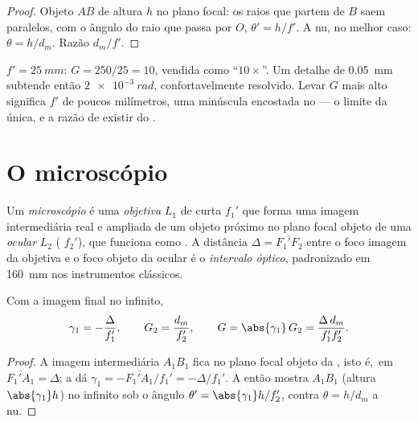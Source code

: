 \begin{proof}
Objeto $AB$ de altura $h$ no plano focal: os raios que partem de $B$ saem
paralelos, com o ângulo do raio que passa por $O$, $\theta' = h/f'$. A 
nu, no melhor caso: $\theta = h/d_m$. Razão $d_m/f'$.
\end{proof}

\begin{example}\label{ex:b1:optical-instruments:loupe}
$f' = \qty{25}{mm}$: $G = 250/25 = 10$, vendida como ``$10\times$''. Um
detalhe de \qty{0.05}{mm} subtende então $\qty{2e-3}{rad}$, confortavelmente
resolvido. Levar $G$ mais alto significa $f'$ de poucos milímetros, uma 
minúscula encostada no  --- o limite da  única, e a
razão de existir do .
\end{example}

\section{O microscópio}

\begin{definition}\label{def:b1:optical-instruments:microscope}
Um \emph{microscópio} é uma \emph{objetiva} $L_1$ de curta 
$f_1'$ que forma uma imagem intermediária real e ampliada de um objeto próximo
no plano focal objeto de uma \emph{ocular} $L_2$ (
$f_2'$), que funciona como . A distância $\Delta =
\overline{F_1'F_2}$ entre o foco imagem da objetiva e o foco objeto
da ocular é o \emph{intervalo óptico}, padronizado em
\qty{160}{mm} nos instrumentos clássicos.
\end{definition}

\begin{proposition}\label{prop:b1:optical-instruments:microscope}
Com a imagem final no infinito,
\[
\gamma_1 = -\frac{\Delta}{f_1'}, \qquad G_2 = \frac{d_m}{f_2'},
\qquad G = \abs{\gamma_1}\,G_2 = \frac{\Delta\,d_m}{f_1' f_2'} .
\]
\end{proposition}

\begin{proof}
A imagem intermediária $A_1B_1$ fica no plano focal objeto da ,
isto é,\ em $\overline{F_1'A_1} = \Delta$; a  dá
$\gamma_1 = -\overline{F_1'A_1}/f_1' = -\Delta/f_1'$. A  então
mostra $A_1B_1$ (altura $\abs{\gamma_1} h$) no infinito sob o ângulo
$\theta' = \abs{\gamma_1} h/f_2'$, contra $\theta = h/d_m$ a 
nu.
\end{proof}


